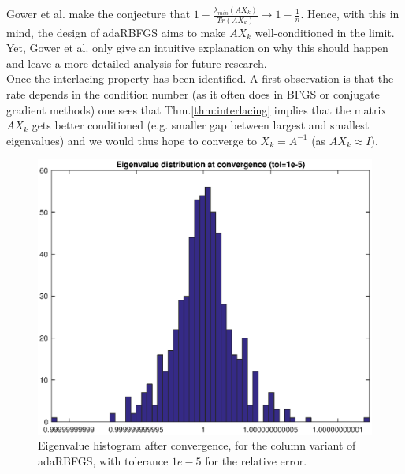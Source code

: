 \documentclass[12pt,conference,compsocconf]{IEEEtran}
\begin{document}
Gower et al. make the conjecture that $ 1- \frac{\lambda_{min}(AX_k)}{Tr(AX_k)}\rightarrow 1 - \frac{1}{n}.$ Hence, with this in mind, the design of adaRBFGS aims to make $AX_k$ well-conditioned in the limit. Yet, Gower et al. only give an intuitive explanation on why this should happen and leave  a more detailed analysis for future research.\\
Once the interlacing property has been identified. A first observation is that the rate depends in the condition number (as it often does in BFGS or conjugate gradient methods) one sees that Thm.\ref{thm:interlacing} implies that the matrix $AX_k$ gets better conditioned (e.g. smaller gap between largest and smallest eigenvalues) and we would thus hope to converge to $X_k=A^{-1}$ (as $AX_k\approx I$).
\begin{figure}
  \centering
  \includegraphics[height=0.7\columnwidth,width=1.0\columnwidth]{eigditstol5.eps}
  
  \vspace{-2mm}
  \caption{Eigenvalue histogram after convergence, for the column variant of adaRBFGS, with tolerance $1e-5$ for the relative error. \label{fig:eighist5}}  
  
\end{figure}
\end{document}
